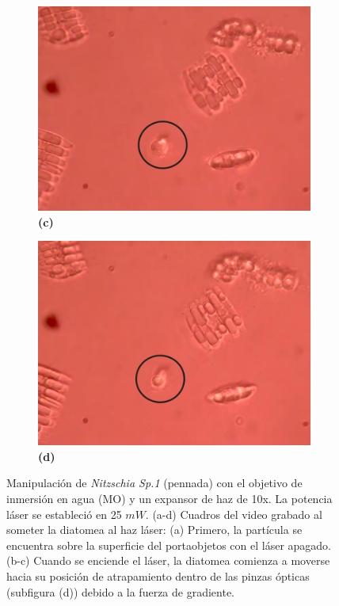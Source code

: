 \documentclass[10pt,aspectratio=1610,compress,dvipsnames]{beamer}
\begin{document}
\begin{frame}
{\begin{figure}
  \begin{subfigure}[b]{0.2\linewidth}
    \includegraphics[width=\linewidth]{ResultadosAlgea1/3.png} %
    \caption*{\textbf{(c)}}
    \label{fig7:c}
  \end{subfigure}\hspace{0.5cm} %
  \begin{subfigure}[b]{0.2\linewidth}
    \includegraphics[width=\linewidth]{ResultadosAlgea1/1.png} %
    \caption*{\textbf{(d)}}
    \label{fig7:d}
  \end{subfigure}
  \caption{
Manipulación de \textit{Nitzschia Sp.1} (pennada) con el objetivo de inmersión en agua (MO) y un expansor de haz de 10x. La potencia láser se estableció en 25 $mW$. (a-d) Cuadros del video grabado al someter la diatomea al haz láser: (a) Primero, la partícula se encuentra sobre la superficie del portaobjetos con el láser apagado. (b-c) Cuando se enciende el láser, la diatomea comienza a moverse hacia su posición de atrapamiento dentro de las pinzas ópticas (subfigura (d)) debido a la fuerza de gradiente. }
  \label{poresfrustrules}
\end{figure}


}
\end{frame}
\end{document}
